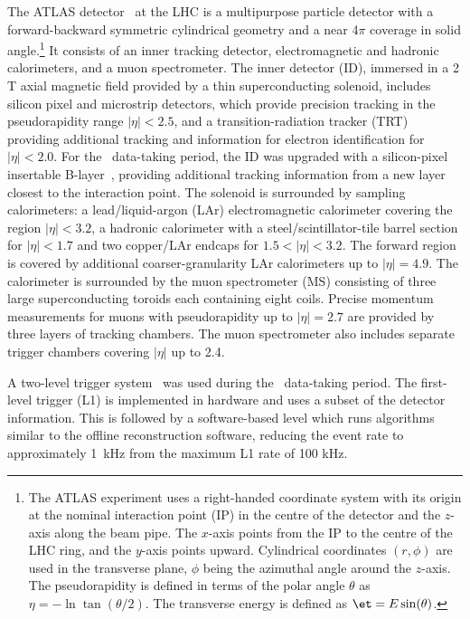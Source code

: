 The ATLAS detector~\cite{ATLASDET-2008} at the LHC is a multipurpose particle detector with a forward-backward 
symmetric cylindrical geometry and a near 4$\pi$ coverage in solid angle.\footnote{The ATLAS experiment uses a 
right-handed coordinate system with its origin at the nominal interaction point (IP) in the centre 
of the detector and the $z$-axis along the beam pipe. The $x$-axis points from the IP to the centre of the 
LHC ring, and the $y$-axis points upward. Cylindrical coordinates $(r,\phi)$ are used in the transverse plane, 
$\phi$ being the azimuthal angle around the $z$-axis. The pseudorapidity is defined in terms of the polar 
angle $\theta$ as $\eta=-\ln\tan(\theta/2)$. The transverse energy is defined as $\et = E \sin(\theta)$.}
It consists of an inner tracking
detector, electromagnetic and hadronic calorimeters, and a muon spectrometer.
The inner detector (ID), immersed in a 2 T axial magnetic field provided by a thin superconducting
solenoid, includes silicon pixel and microstrip detectors,
which provide precision tracking in the pseudorapidity range  $|\eta| <2.5$, and a transition-radiation
tracker (TRT) providing additional tracking and information for electron 
identification for  $|\eta| <2.0$. For the \sqtt\
data-taking period, the ID was upgraded with a silicon-pixel insertable B-layer~\cite{ATLASDET-IBL},
providing additional tracking information from a new layer closest to the interaction point.
The solenoid is surrounded by sampling calorimeters: a lead/liquid-argon (LAr) 
electromagnetic calorimeter covering the region $|\eta| <3.2$, a hadronic calorimeter with a
steel/scintillator-tile barrel section for $|\eta| < 1.7$ and two copper/LAr endcaps
for $1.5 < |\eta| < 3.2$. 
The forward region is covered by additional coarser-granularity LAr calorimeters up to $|\eta| = 4.9$. 
The calorimeter is surrounded by the muon spectrometer (MS) consisting of three large 
superconducting toroids each containing eight coils.
Precise momentum measurements for muons with pseudorapidity up to $|\eta| = 2.7$
are provided by three layers of tracking chambers.
The muon spectrometer also includes separate 
trigger chambers covering $|\eta|$ up to 2.4.

A two-level trigger system~\cite{ATLAS:trigperf} was used during the \sqtt~data-taking period. 
The first-level trigger (L1) is implemented
in hardware and uses a subset of the detector information. This is followed by a software-based
level which runs algorithms similar to the offline reconstruction software, reducing the event rate to 
approximately 1~kHz from the maximum L1 rate of 100 kHz.

